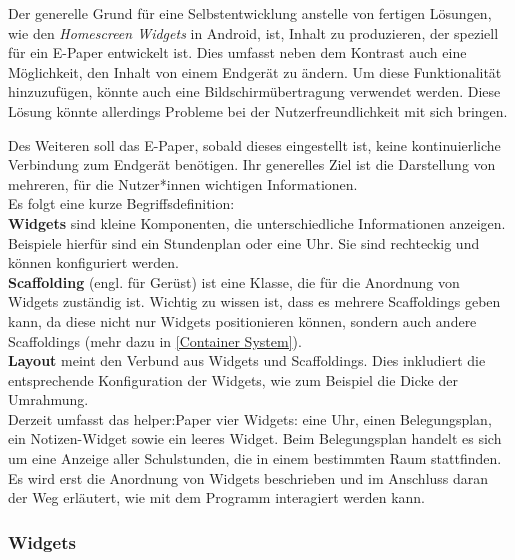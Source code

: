 \documentclass[10pt]{article}
\begin{document}
Der generelle Grund für eine Selbstentwicklung anstelle von fertigen Lösungen, wie den \textit{Homescreen Widgets} in Android, ist, Inhalt zu produzieren, der speziell für ein E-Paper entwickelt ist. Dies umfasst neben dem Kontrast auch eine Möglichkeit, den Inhalt von einem Endgerät zu ändern. Um diese Funktionalität hinzuzufügen, könnte  auch eine Bildschirmübertragung verwendet werden. Diese Lösung könnte allerdings Probleme bei der Nutzerfreundlichkeit mit sich bringen.

Des Weiteren soll das E-Paper, sobald dieses eingestellt ist, keine kontinuierliche Verbindung zum Endgerät benötigen. Ihr generelles Ziel ist die Darstellung von mehreren, für die Nutzer*innen wichtigen Informationen.\\
Es folgt eine kurze Begriffsdefinition:
\mbox{}\vspace{6pt}\\
\textbf{Widgets} sind kleine Komponenten, die unterschiedliche Informationen anzeigen. Beispiele hierfür sind ein Stundenplan oder eine Uhr. Sie sind rechteckig und können konfiguriert werden.
\mbox{}\vspace{6pt}\\
\textbf{Scaffolding} (engl. für Gerüst) ist eine Klasse, die für die Anordnung von Widgets zuständig ist. Wichtig zu wissen ist, dass es mehrere Scaffoldings geben kann, da diese nicht nur Widgets positionieren können, sondern auch andere Scaffoldings (mehr dazu in \ref{Container System}). 
\mbox{}\vspace{6pt}\\
\textbf{Layout} meint den Verbund aus Widgets und Scaffoldings. Dies inkludiert die entsprechende Konfiguration der Widgets, wie zum Beispiel die Dicke der Umrahmung. 
\mbox{}\vspace{6pt}\\
Derzeit umfasst das helper:Paper vier Widgets: eine Uhr, einen Belegungsplan, ein Notizen-Widget sowie ein leeres Widget. Beim Belegungsplan handelt es sich um eine Anzeige aller Schulstunden, die in einem bestimmten Raum stattfinden.
Es wird erst die Anordnung von Widgets beschrieben und im Anschluss daran der Weg erläutert, wie mit dem Programm interagiert werden kann.

\subsubsection{Widgets}\label{Widgets}
\end{document}
